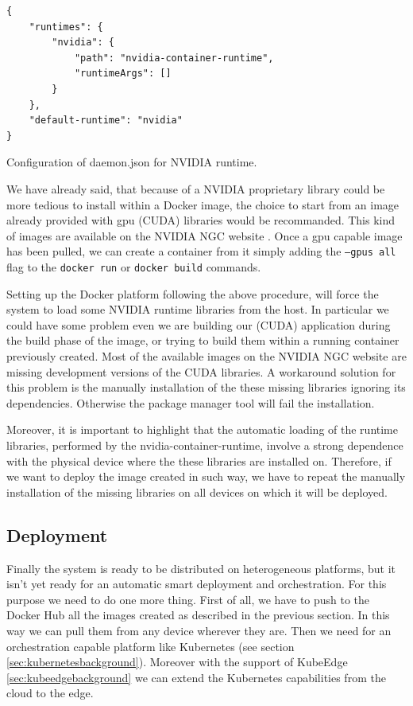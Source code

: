 \begin{listing}[H]
\begin{verbatim}
{
	"runtimes": {
		"nvidia": {
			"path": "nvidia-container-runtime",
			"runtimeArgs": []
		}
	},
	"default-runtime": "nvidia"
}
\end{verbatim}
\caption{Configuration of daemon.json for NVIDIA runtime.}
\label{lst:daemonconfig}
\end{listing}

We have already said, that because of a NVIDIA proprietary library could be more tedious to install within a Docker image, the choice to start from an image already provided with gpu (CUDA) libraries would be recommanded. This kind of images are available on the NVIDIA NGC website \cite{nvidiangc}. Once a gpu capable image has been pulled, we can create a container from it simply adding the \texttt{--gpus all} flag to the \texttt{docker run} or \texttt{docker build} commands.

Setting up the Docker platform following the above procedure, will force the system to load some NVIDIA runtime libraries from the host. 
In particular we could have some problem even we are building our (CUDA) application during the build phase of the image, or trying to build them within a running container previously created. 
Most of the available images on the NVIDIA NGC website are missing development versions of the CUDA libraries. A workaround solution for this problem is the manually installation of the these missing libraries ignoring its dependencies. Otherwise the package manager tool will fail the installation.

Moreover, it is important to highlight that the automatic loading of the runtime libraries, performed by the nvidia-container-runtime, involve a strong dependence with the physical device where the these libraries are installed on. Therefore, if we want to deploy the image created in such way, we have to repeat the manually installation of the missing libraries on all devices on which it will be deployed.



\subsection{Deployment}\label{sec:deployment}
Finally the system is ready to be distributed on heterogeneous platforms, but it isn't yet ready for an automatic smart deployment and orchestration.
For this purpose we need to do one more thing. First of all, we have to push to the Docker Hub all the images created as described in the previous section. In this way we can pull them from any device wherever they are. Then we need for an orchestration capable platform like Kubernetes (see section \ref{sec:kubernetesbackground}). Moreover with the support of KubeEdge \ref{sec:kubeedgebackground} we can extend the Kubernetes capabilities from the cloud to the edge.

